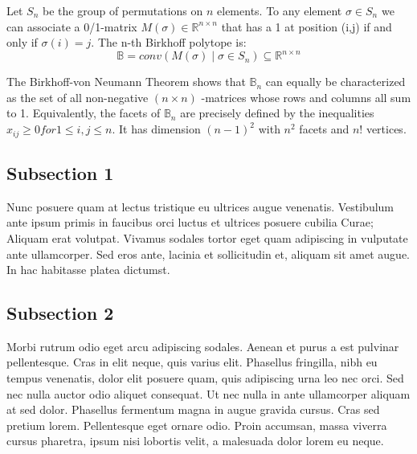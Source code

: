  Let $S_n$ be the group of permutations on $n$ elements. To any element $\sigma \in S_n$ we can associate a 0/1-matrix $M( \sigma ) \in \mathbb{R}^{n \times n}$ that has a 1 at position (i,j) if and only if $\sigma(i)=j$. The n-th Birkhoff polytope is:
\begin{equation}
\mathbb{B} = conv(M( \sigma ) \mid \sigma \in S_n ) \subseteq \mathbb{R}^{n \times n}
\label{eqn:Einstein}
\end{equation}	

The Birkhoff-von Neumann Theorem shows that $\mathbb{B}_n$ can equally be characterized as the set of all non-negative $(n \times n)$ -matrices whose rows and columns all sum to 1. Equivalently, the facets of $\mathbb{B}_n$ are precisely defined by the inequalities $x_{ij} \geq 0 for 1 \leq i, j \leq n$. It has dimension $(n-1)^2$ with $n^2$ facets and $n!$ vertices.



\subsection{Subsection 1}

Nunc posuere quam at lectus tristique eu ultrices augue venenatis. Vestibulum ante ipsum primis in faucibus orci luctus et ultrices posuere cubilia Curae; Aliquam erat volutpat. Vivamus sodales tortor eget quam adipiscing in vulputate ante ullamcorper. Sed eros ante, lacinia et sollicitudin et, aliquam sit amet augue. In hac habitasse platea dictumst.



\subsection{Subsection 2}
Morbi rutrum odio eget arcu adipiscing sodales. Aenean et purus a est pulvinar pellentesque. Cras in elit neque, quis varius elit. Phasellus fringilla, nibh eu tempus venenatis, dolor elit posuere quam, quis adipiscing urna leo nec orci. Sed nec nulla auctor odio aliquet consequat. Ut nec nulla in ante ullamcorper aliquam at sed dolor. Phasellus fermentum magna in augue gravida cursus. Cras sed pretium lorem. Pellentesque eget ornare odio. Proin accumsan, massa viverra cursus pharetra, ipsum nisi lobortis velit, a malesuada dolor lorem eu neque.


